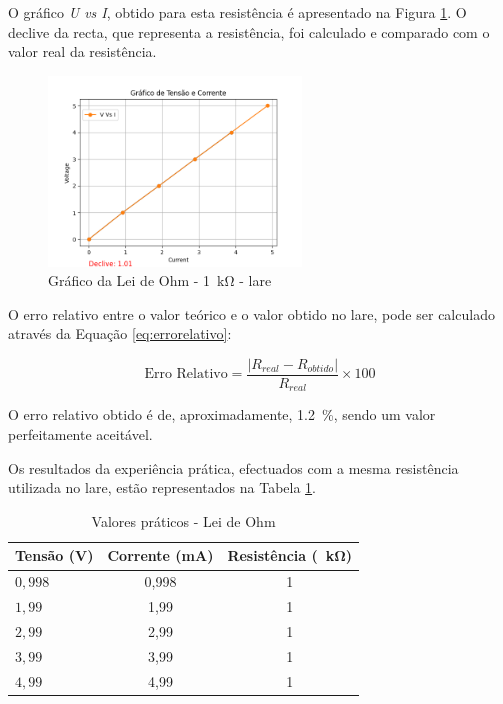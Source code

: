 O gráfico \textit{U vs I}, obtido para esta resistência é apresentado na Figura \ref{fig:grafico_LaRE_1k}. O declive da recta, que representa a resistência, foi calculado e comparado com o valor real da resistência. 

\begin{figure}[hbtp]
	\centering
	\includegraphics[width=0.6\textwidth]{figures/ohm_graph.png}
	\caption{Gráfico da Lei de Ohm - \SI{1}{\kilo\ohm} - \acrshort{lare}}
	\label{fig:grafico_LaRE_1k}
\end{figure}

O erro relativo entre o valor teórico e o valor obtido no \acrshort{lare}, pode ser calculado através da Equação \ref{eq:errorelativo}:

\begin{equation} \label{eq:errorelativo}
	\text{Erro Relativo} = \frac{|R_{real} - R_{obtido}|}{R_{real}} \times 100
\end{equation}

O erro relativo obtido é de, aproximadamente, \SI{1,2}{\percent}, sendo um valor perfeitamente aceitável.

Os resultados da experiência prática, efectuados com a mesma resistência utilizada no \acrshort{lare}, estão representados na Tabela \ref{Table:valoresexperimentaisohm}.

\begin{table}[htb]
	\centering
	\caption{Valores práticos - Lei de Ohm} 
	\label{Table:valoresexperimentaisohm}
	\begin{tabular}{lcc}
		\toprule
		Tensão (V)& Corrente (mA) & Resistência (\SI{}{\kilo\ohm}) \\
		\midrule
		$0,998$ & 0,998 & 1  \\
		\midrule
		 $1,99$ & 1,99  & 1  \\
		 \midrule
		 $2,99$ & 2,99  & 1  \\
		 \midrule
		 $3,99$ & 3,99  & 1  \\
		 \midrule
		 $4,99$ & 4,99  & 1  \\
		\bottomrule
	\end{tabular}
\end{table}

